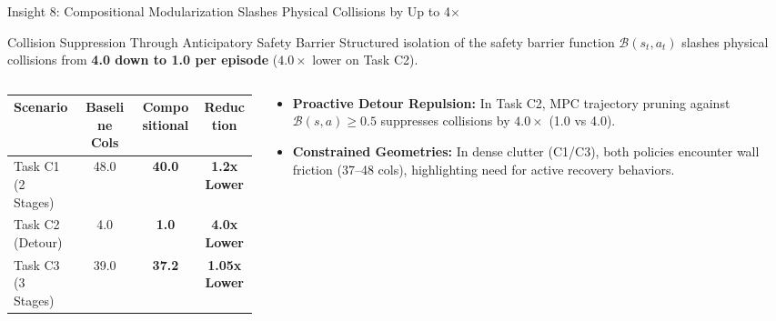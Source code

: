 \documentclass[aspectratio=169, 10pt]{beamer}
\begin{document}
\begin{frame}{Insight 8: Compositional Modularization Slashes Physical Collisions by Up to 4$\times$}
  \begin{block}{Collision Suppression Through Anticipatory Safety Barrier}
    Structured isolation of the safety barrier function $\mathcal{B}(s_t, a_t)$ slashes physical collisions from \textbf{4.0 down to 1.0 per episode} ($4.0\times$ lower on Task C2).
  \end{block}
  \vspace{-0.2cm}
  \begin{columns}[T]
    \begin{column}{0.50\textwidth}
      \setlength{\tabcolsep}{3pt}
      \begin{table}
        \centering
        \scriptsize
        \begin{tabular}{lccc}
          \toprule
          \textbf{Scenario} & \textbf{Baseline Cols} & \textbf{Compositional} & \textbf{Reduction} \\
          \midrule
          Task C1 (2 Stages) & 48.0 & \textbf{40.0} & \textbf{1.2x Lower} \\
          Task C2 (Detour) & 4.0 & \textbf{1.0} & \textbf{4.0x Lower} \\
          Task C3 (3 Stages) & 39.0 & \textbf{37.2} & \textbf{1.05x Lower} \\
          \bottomrule
        \end{tabular}
      \end{table}
    \end{column}
    \begin{column}{0.46\textwidth}
      \begin{itemize}
        \item \textbf{Proactive Detour Repulsion:} In Task C2, MPC trajectory pruning against $\mathcal{B}(s, a) \ge 0.5$ suppresses collisions by $4.0\times$ (1.0 vs 4.0).
        \item \textbf{Constrained Geometries:} In dense clutter (C1/C3), both policies encounter wall friction (37--48 cols), highlighting need for active recovery behaviors.
      \end{itemize}
    \end{column}
  \end{columns}
\end{frame}
\end{document}
